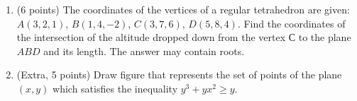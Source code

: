 \documentclass[]{exam}
\begin{document}
\begin{enumerate}
\item (6 points)  The coordinates of the vertices of a regular tetrahedron are given: $A(3,2,1)$, $B(1,4,-2)$, $C(3,7,6)$, $D(5,8,4)$. Find the coordinates of the intersection of the altitude dropped down from the vertex $С$ to the plane $ABD$ and its length. The answer may contain roots. 




\item (Extra, 5 points) Draw figure that represents the set of points of the plane $(x,y)$ which satisfies the inequality $y^3+yx^2 \ge y$.


\end{enumerate}
\end{document}
